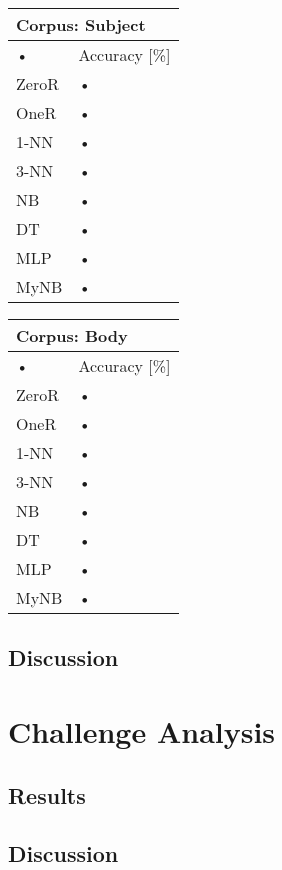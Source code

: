 \documentclass[10pt, a4paper]{article}
\begin{document}
\begin{tabular}{|l|l|}
\hline
\multicolumn{2}{|l|}{Corpus: Subject} \\
\hline
• & Accuracy [\%] \\
\hline
ZeroR & • \\
\hline
OneR & • \\
\hline
1-NN & • \\
\hline
3-NN & • \\
\hline
NB & • \\
\hline
DT & • \\
\hline
MLP & • \\
\hline
MyNB & • \\
\hline
\end{tabular}

\begin{tabular}{|l|l|}
\hline
\multicolumn{2}{|l|}{Corpus: Body} \\
\hline
• & Accuracy [\%] \\
\hline
ZeroR & • \\
\hline
OneR & • \\
\hline
1-NN & • \\
\hline
3-NN & • \\
\hline
NB & • \\
\hline
DT & • \\
\hline
MLP & • \\
\hline
MyNB & • \\
\hline
\end{tabular}

\subsection{Discussion}


\section{Challenge Analysis}

\subsection{Results}

\subsection{Discussion}
\end{document}
